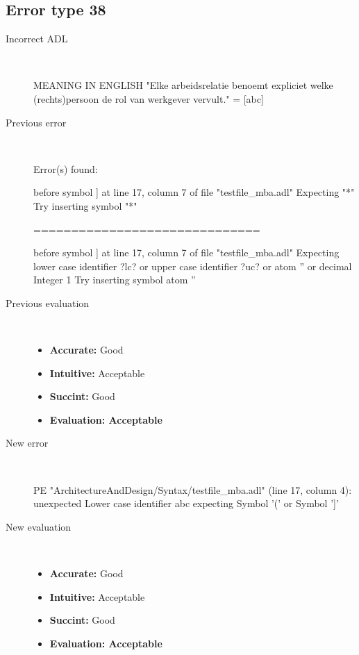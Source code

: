 \hrulefill

\subsection{Error type 38}
  \begin{description}
  \item[Incorrect ADL]~\\
\begin{adl}
MEANING IN ENGLISH "Elke arbeidsrelatie benoemt expliciet welke (rechts)persoon de rol van werkgever vervult."
= [abc]\end{adl}
  \item[Previous error]~\\
\begin{haskell}
Error(s) found:

before symbol ] at line 17, column 7 of file "testfile_mba.adl"
Expecting "*"
Try inserting symbol "*"

==============================

before symbol ] at line 17, column 7 of file "testfile_mba.adl"
Expecting lower case identifier ?lc? or upper case identifier ?uc? or atom '' or
 decimal Integer 1
Try inserting symbol atom ''
\end{haskell}
  \item[Previous evaluation]~\\
    \begin{itemize}
    \item \textbf{Accurate:} Good
    \item \textbf{Intuitive:} Acceptable
    \item \textbf{Succint:} Good
    \item \textbf{Evaluation: Acceptable}
    \end{itemize}
  \item[New error]~\\
\begin{haskell}
PE "ArchitectureAndDesign/Syntax/testfile_mba.adl" (line 17, column 4):
unexpected Lower case identifier abc
expecting Symbol '(' or Symbol ']'\end{haskell}
  \item[New evaluation]~\\
    \begin{itemize}
    \item \textbf{Accurate:} Good
    \item \textbf{Intuitive:} Acceptable
    \item \textbf{Succint:} Good
    \item \textbf{Evaluation: Acceptable
}
    \end{itemize}
  \end{description}

